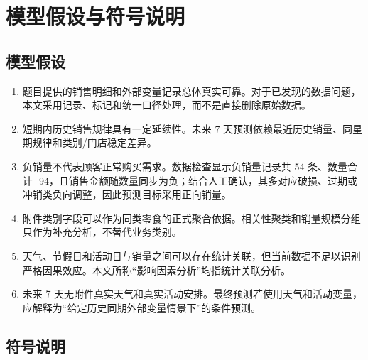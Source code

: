 \section{模型假设与符号说明}

\subsection{模型假设}

\begin{enumerate}
  \item 题目提供的销售明细和外部变量记录总体真实可靠。对于已发现的数据问题，本文采用记录、标记和统一口径处理，而不是直接删除原始数据。
  \item 短期内历史销售规律具有一定延续性。未来 7 天预测依赖最近历史销量、同星期规律和类别/门店稳定差异。
  \item 负销量不代表顾客正常购买需求。数据检查显示负销量记录共 54 条、数量合计 -94，且销售金额随数量同步为负；结合人工确认，其多对应破损、过期或冲销类负向调整，因此预测目标采用正向销量。
  \item 附件类别字段可以作为同类零食的正式聚合依据。相关性聚类和销量规模分组只作为补充分析，不替代业务类别。
  \item 天气、节假日和活动日与销量之间可以存在统计关联，但当前数据不足以识别严格因果效应。本文所称“影响因素分析”均指统计关联分析。
  \item 未来 7 天无附件真实天气和真实活动安排。最终预测若使用天气和活动变量，应解释为“给定历史同期外部变量情景下”的条件预测。
\end{enumerate}

\subsection{符号说明}

